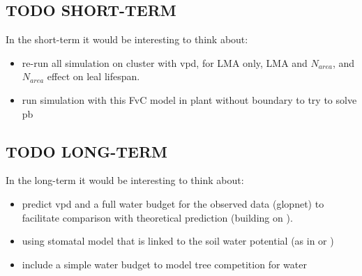 \documentclass[a4paper,11pt]{article}
\begin{document}
\clearpage

\subsection{TODO SHORT-TERM}

In the short-term it would be interesting to think about:

\begin{itemize}

\item re-run all simulation on cluster with vpd, for LMA only, LMA and $N_{area}$, and $N_{area}$ effect on leal lifespan.

\item run simulation with this FvC model in plant without boundary to try to solve pb

\end{itemize}


\subsection{TODO LONG-TERM}

In the long-term it would be interesting to think about:

\begin{itemize}

\item predict vpd and a full water budget for the observed data (glopnet) to facilitate comparison with theoretical prediction (building on \citet{Prentice-2014}).

\item using stomatal model that is linked to the soil water potential (as in \citet{Sperry-2016} or
\citet{Sterck-2011})

\item include a simple water budget to model tree competition for water

\end{itemize}






\end{document}
